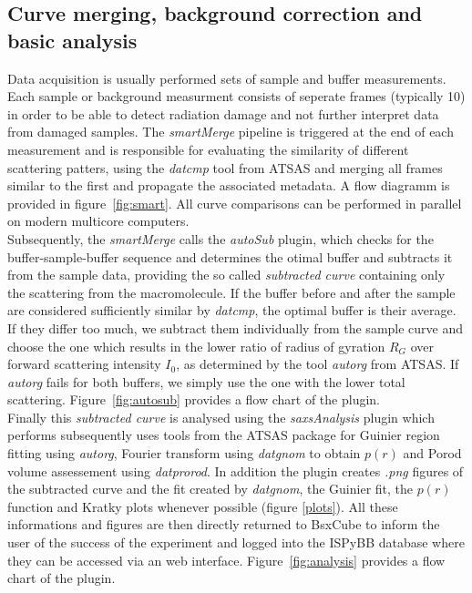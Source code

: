 \documentclass[preprint,pdf]{iucr}              %
\begin{document}
\subsection{Curve merging, background correction and basic analysis}
Data acquisition is usually performed sets of sample and buffer measurements. Each sample or background measurment consists of seperate frames (typically 10) 
in order to be able to detect radiation damage and not further interpret data from damaged samples.
The \textit{smartMerge} pipeline is triggered at the end of each measurement
and is responsible for evaluating the similarity of different scattering
patters, using the \textit{datcmp} tool from ATSAS and merging all frames
similar to the first and propagate the associated metadata. A flow diagramm is provided in figure~\ref{fig:smart}. All curve comparisons
can be performed in parallel on modern multicore computers.\\

Subsequently, the \textit{smartMerge} calls the \textit{autoSub} plugin, which checks for the buffer-sample-buffer
sequence and determines the otimal buffer and subtracts it from the
sample data, providing the so called \textit{subtracted curve} containing only
the scattering from the macromolecule. If the buffer before and after the sample are considered sufficiently similar by \textit{datcmp}, the optimal buffer is their average. If they differ too much, we subtract them individually from the sample curve and choose the one which results in the lower ratio of radius of gyration $R_{G}$ over forward scattering intensity $I_{0}$, as determined by the tool \textit{autorg} from ATSAS. If \textit{autorg} fails for both buffers, we simply use the one with the lower total scattering. Figure~\ref{fig:autosub} provides a flow chart of the plugin.\\

Finally this \textit{subtracted curve} is analysed using the 
\textit{saxsAnalysis} plugin which performs  subsequently uses tools from the ATSAS package for Guinier region fitting
using \textit{autorg}, Fourier transform using \textit{datgnom} to obtain
$p(r)$ and Porod volume assessement using \textit{datprorod}. In addition the plugin creates \textit{.png} figures of the subtracted curve and the fit created by \textit{datgnom}, the Guinier fit, the $p(r)$ function and Kratky plots whenever possible (figure \ref{plots}).
All these informations and figures are then directly returned to BsxCube to inform the user
of the success of the experiment and logged into the ISPyBB
database\cite{ispybb} where they can be accessed via an web interface. Figure~\ref{fig:analysis} provides a flow chart of the plugin.
\end{document}
